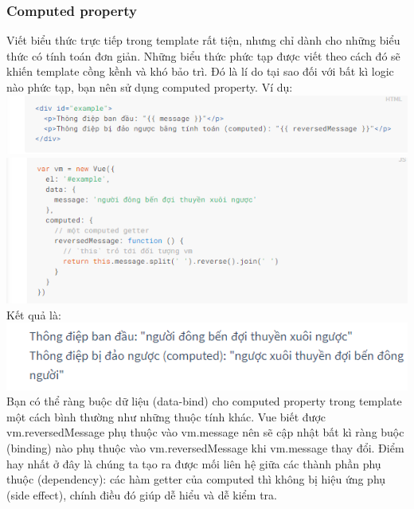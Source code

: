 \documentclass[12pt,a4paper]{report}
\begin{document}
\subsubsection{Computed property}
Viết biểu thức trực tiếp trong template rất tiện, nhưng chỉ dành cho những biểu thức có tính toán đơn giản. Những biểu thức phức tạp được viết theo cách đó sẽ khiến template cồng kềnh và khó bảo trì. Đó là lí do tại sao đối với bất kì logic nào phức tạp, bạn nên sử dụng computed property. Ví dụ:
\\\includegraphics[scale=.93]{17}\\
\includegraphics[scale=.93]{18}\\ Kết quả là: \\
\includegraphics[scale=.93]{19}\\Bạn có thể ràng buộc dữ liệu (data-bind) cho computed property trong template một cách bình thường như những thuộc tính khác. Vue biết được vm.reversedMessage phụ thuộc vào vm.message nên sẽ cập nhật bất kì ràng buộc (binding) nào phụ thuộc vào vm.reversedMessage khi vm.message thay đổi. Điểm hay nhất ở đây là chúng ta tạo ra được mối liên hệ giữa các thành phần phụ thuộc (dependency): các hàm getter của computed thì không bị hiệu ứng phụ (side effect), chính điều đó giúp dễ hiểu và dễ kiểm tra.
\end{document}
